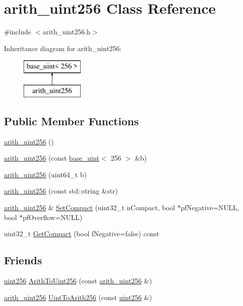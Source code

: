 \hypertarget{classarith__uint256}{}\section{arith\+\_\+uint256 Class Reference}
\label{classarith__uint256}


{\ttfamily \#include $<$arith\+\_\+uint256.\+h$>$}

Inheritance diagram for arith\+\_\+uint256\+:\begin{figure}[H]
\begin{center}
\leavevmode
\includegraphics[height=2.000000cm]{classarith__uint256}
\end{center}
\end{figure}
\subsection*{Public Member Functions}
\begin{DoxyCompactItemize}
\item 
\hyperlink{classarith__uint256_a1dae7481f3ebf5457f70aaf385d566dd}{arith\+\_\+uint256} ()
\item 
\hyperlink{classarith__uint256_a86c126d261e0edeea49e051e2f3b98a7}{arith\+\_\+uint256} (const \hyperlink{classbase__uint}{base\+\_\+uint}$<$ 256 $>$ \&b)
\item 
\hyperlink{classarith__uint256_a865adeb2767f24e0efc3abfb3d75170b}{arith\+\_\+uint256} (uint64\+\_\+t b)
\item 
\hyperlink{classarith__uint256_a0e8b76f74ffb7a251b15aff89b087fbf}{arith\+\_\+uint256} (const std\+::string \&str)
\item 
\hyperlink{classarith__uint256}{arith\+\_\+uint256} \& \hyperlink{classarith__uint256_a458133c9f123519646b07e6143f2164f}{Set\+Compact} (uint32\+\_\+t n\+Compact, bool $\ast$pf\+Negative=N\+U\+L\+L, bool $\ast$pf\+Overflow=N\+U\+L\+L)
\item 
uint32\+\_\+t \hyperlink{classarith__uint256_a943e22c7910b92d5e48c71f420c4ae30}{Get\+Compact} (bool f\+Negative=false) const 
\end{DoxyCompactItemize}
\subsection*{Friends}
\begin{DoxyCompactItemize}
\item 
\hyperlink{classuint256}{uint256} \hyperlink{classarith__uint256_aef075fd8d1a7e5937e9775b8e82c8a1b}{Arith\+To\+Uint256} (const \hyperlink{classarith__uint256}{arith\+\_\+uint256} \&)
\item 
\hyperlink{classarith__uint256}{arith\+\_\+uint256} \hyperlink{classarith__uint256_a9c9f84c20851f10a8ca5082bec97666a}{Uint\+To\+Arith256} (const \hyperlink{classuint256}{uint256} \&)
\end{DoxyCompactItemize}
